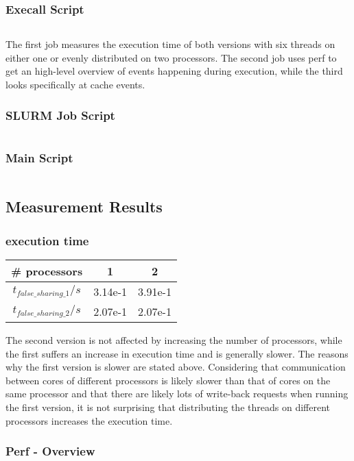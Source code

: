 \documentclass[parskip]{scrartcl}
\begin{document}
	\subsubsection{Execall Script}
	\inputminted{bash}{false_sharing/execall.sh}
	
	The first job measures the execution time of both versions with six threads on either one or evenly distributed on two processors. The second job uses perf to get an high-level overview of events happening during execution, while the third looks specifically at cache events.
	\subsubsection{SLURM Job Script}
	\inputminted{bash}{false_sharing/job.sh}
	\subsubsection{Main Script}
	\inputminted{bash}{false_sharing/main.sh}
	\subsection{Measurement Results}
	\subsubsection{execution time}
	\begin{tabular}{|c|c|c|}
		\hline \# processors & 1 & 2\\
		\hline $t_{false\_sharing\_1}/s$ & 3.14e-1 & 3.91e-1\\
		\hline $t_{false\_sharing\_2}/s$ & 2.07e-1 & 2.07e-1\\
		\hline
	\end{tabular}
	
	The second version is not affected by increasing the number of processors, while the first suffers an increase in execution time and is generally slower. The reasons why the first version is slower are stated above. Considering that communication between cores of different processors is likely slower than that of cores on the same processor and that there are likely lots of write-back requests when running the first version, it is not surprising that distributing the threads on different processors increases the execution time.
	
	\subsubsection{Perf - Overview}
	
\end{document}
